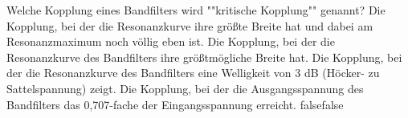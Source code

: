     {Welche Kopplung eines Bandfilters wird ""kritische Kopplung"" genannt?}
    {Die Kopplung, bei der die Resonanzkurve ihre größte Breite hat und dabei am Resonanzmaximum noch völlig eben ist.}
    {Die Kopplung, bei der die Resonanzkurve des Bandfilters ihre größtmögliche Breite hat.}
    {Die Kopplung, bei der die Resonanzkurve des Bandfilters eine Welligkeit von 3 dB (Höcker- zu Sattelspannung) zeigt.}
    {Die Kopplung, bei der die Ausgangsspannung des Bandfilters das 0,707-fache der Eingangsspannung erreicht.}
    {false}{false}